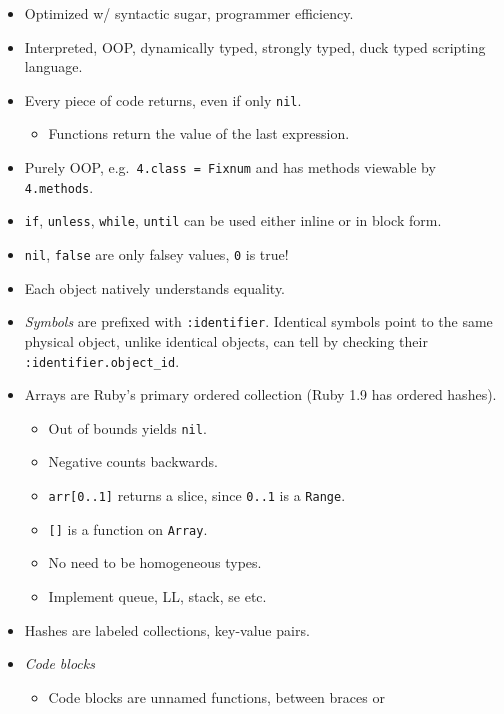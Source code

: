 \documentclass[10pt, twocolumn, landscape]{article}
\begin{document}
\begin{itemize}
    \item Optimized w/ syntactic sugar, programmer efficiency.
    \item Interpreted, OOP, dynamically typed, strongly typed, duck
        typed scripting language.
    \item Every piece of code returns, even if only \texttt{nil}.
        \begin{itemize}
            \item Functions return the value of the last expression.
        \end{itemize}
    \item Purely OOP, e.g.\ \texttt{4.class = Fixnum} and has methods viewable
        by \texttt{4.methods}.
    \item \texttt{if}, \texttt{unless}, \texttt{while}, \texttt{until} can be
        used either inline or in block form.
    \item \texttt{nil}, \texttt{false} are only falsey values, \texttt{0} is
        true!
    \item Each object natively understands equality.
    \item \emph{Symbols} are prefixed with \texttt{:identifier}. Identical
        symbols point to the same physical object, unlike identical objects, can
        tell by checking their \texttt{:identifier.object\_id}.
    \item Arrays are Ruby's primary ordered collection (Ruby 1.9 has ordered
        hashes).
        \begin{itemize}
            \item Out of bounds yields \texttt{nil}.
            \item Negative counts backwards.
            \item \texttt{arr[0..1]} returns a slice, since \texttt{0..1} is a
                \texttt{Range}.
            \item \texttt{[]} is a function on \texttt{Array}.
            \item No need to be homogeneous types.
            \item Implement queue, LL, stack, se etc.\@
        \end{itemize}
    \item Hashes are labeled collections, key-value pairs.
    \item \emph{Code blocks}
        \begin{itemize}
            \item Code blocks are unnamed functions, between braces or

\end{itemize}
\end{itemize}
\end{document}
